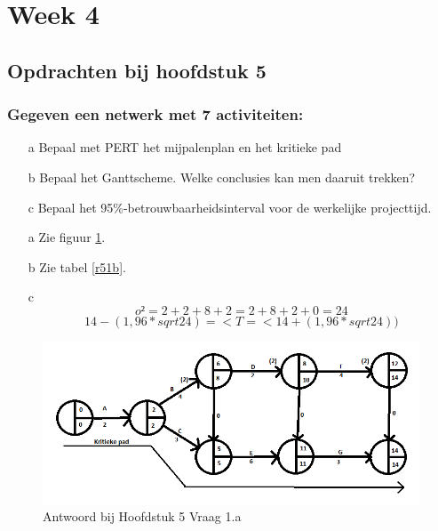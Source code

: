 \documentclass[a4paper,titlepage]{artikel1}
\begin{document}
   \section{Week 4}

   \subsection{Opdrachten bij hoofdstuk 5}
   \subsubsection[Opdracht 1]{Gegeven een netwerk met 7 activiteiten:}
   \begin{itemize}
     \item[a] Bepaal met PERT het mijpalenplan en het kritieke pad
     \item[b] Bepaal het Ganttscheme. Welke conclusies kan men daaruit trekken?
     \item[c] Bepaal het 95\%-betrouwbaarheidsinterval voor de werkelijke projecttijd.
   \end{itemize}
   \begin{itemize}
     \item[a] Zie figuur \ref{r51a}.
     \item[b] Zie tabel \ref{r51b}.
     \item[c]
       \begin{displaymath}
         o²=2+2+8+2=2+8+2+0=24
       \end{displaymath}
       \begin{displaymath}
         14-(1,96*sqrt{24})=<T=<14+(1,96*sqrt{24}))
       \end{displaymath}
   \end{itemize}
       \begin{figure}[tbh]
         \caption{Antwoord bij Hoofdstuk 5 Vraag 1.a} \label{r51a}
         \includegraphics[scale=0.75]{H5O1A.png}     
       \end{figure}
\end{document}
